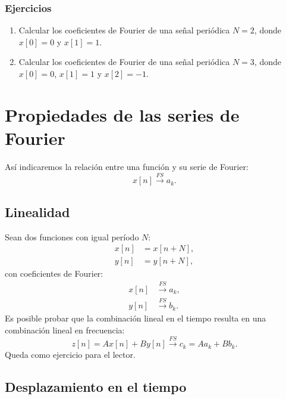 \documentclass[11pt,a4paper,openany]{book}
\begin{document}
\subsubsection{Ejercicios}

\begin{enumerate}
	\item Calcular los coeficientes de Fourier de una señal periódica $N = 2$, donde $x[0] = 0$ y $x[1] = 1$.
	\item Calcular los coeficientes de Fourier de una señal periódica $N = 3$, donde $x[0] = 0$, $x[1] = 1$ y $x[2] = -1$.
\end{enumerate}

\section{Propiedades de las series de Fourier}

Así indicaremos la relación entre una función y su serie de Fourier:
\begin{equation}
	x[n] \xrightarrow{FS} a_{k}.
\end{equation}

\subsection{Linealidad}

Sean dos funciones con igual período $N$:
\begin{align}
	x[n] &= x[n+N], \\
	y[n] &= y[n+N],
\end{align}
con coeficientes de Fourier:
\begin{align}
	x[n] &\xrightarrow{FS} a_{k}, \\
	y[n] &\xrightarrow{FS} b_{k}.
\end{align}
Es posible probar que la combinación lineal en el tiempo resulta en una combinación lineal en frecuencia:
\begin{equation}
	z[n] = A x[n] + B y[n] \xrightarrow{FS} c_{k} = A a_{k} + B b_{k}.
\end{equation}
Queda como ejercicio para el lector.

\subsection{Desplazamiento en el tiempo}
\end{document}
